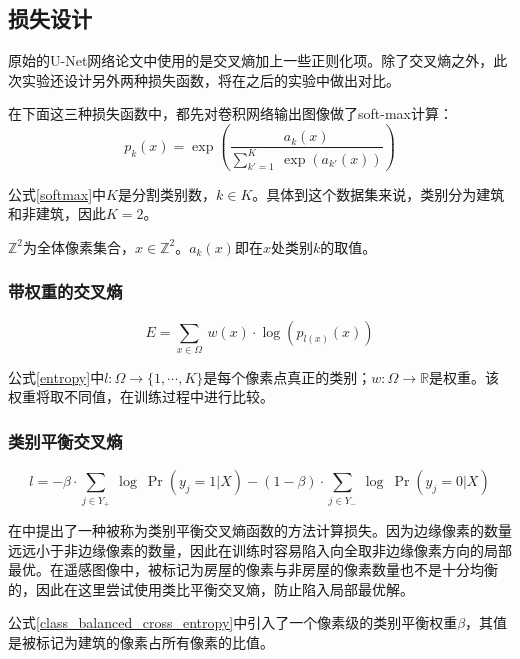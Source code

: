 \subsection{损失设计}
原始的U-Net网络论文中使用的是交叉熵加上一些正则化项。除了交叉熵之外，此次实验还设计另外两种损失函数，将在之后的实验中做出对比。

在下面这三种损失函数中，都先对卷积网络输出图像做了soft-max计算：
\begin{equation}\label{softmax}
p_k(x)=\exp(\frac{a_k(x)}{\sum\limits_{k'=1}^K \ \exp(a_{k'}(x))})
\end{equation}

公式\ref{softmax}中$K$是分割类别数，$k\in K$。具体到这个数据集来说，类别分为建筑和非建筑，因此$K=2$。

$\mathbb{Z}^2$为全体像素集合，$x\in \mathbb{Z}^2$。$a_k(x)$即在$x$处类别$k$的取值。
\subsubsection{带权重的交叉熵}
\begin{equation}\label{entropy}
E=\sum_{x\in \Omega}\ w(x)\cdot \log(p_{l(x)}(x))
\end{equation}

公式\ref{entropy}中$l: \Omega\rightarrow\{1,\cdots,K\}$是每个像素点真正的类别；$w: \Omega\rightarrow\mathbb{R}$是权重。该权重将取不同值，在训练过程中进行比较。
\subsubsection{类别平衡交叉熵}
\begin{equation}\label{class_balanced_cross_entropy}
    l=-\beta\cdot \sum\limits_{j\in Y_+}\ \log\ \Pr(y_j=1|X)-(1-\beta)\cdot \sum\limits_{j\in Y_-}\ \log\ \Pr(y_j=0|X)
\end{equation}

在\cite{xie2015holistically}中提出了一种被称为类别平衡交叉熵函数的方法计算损失。因为边缘像素的数量远远小于非边缘像素的数量，因此在训练时容易陷入向全取非边缘像素方向的局部最优。在遥感图像中，被标记为房屋的像素与非房屋的像素数量也不是十分均衡的，因此在这里尝试使用类比平衡交叉熵，防止陷入局部最优解。



公式\ref{class_balanced_cross_entropy}中引入了一个像素级的类别平衡权重$\beta$，其值是被标记为建筑的像素占所有像素的比值。

